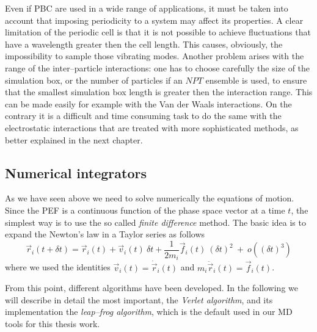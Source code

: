 Even if \ac{PBC} are used in a wide range of applications, it must be taken into account that imposing
periodicity to a system may affect its properties. A clear limitation of the periodic cell is that it is not
possible to achieve fluctuations that have a wavelength greater then the cell length. This causes, obviously, the
impossibility to sample those vibrating modes. Another problem arises with the range of the inter--particle
interactions: one has to choose carefully the size of the simulation box, or the number of particles if an $NPT$
ensemble is used, to ensure that the smallest simulation box length is greater then the interaction range. This
can be made easily for example with the Van der Waals interactions. On the contrary it is a difficult and time
consuming task to do the same with the electrostatic interactions that are treated with more sophisticated
methods, as better explained in the next chapter.

\subsection{Numerical integrators}
As we have seen above we need to solve numerically the equations of motion. Since the \ac{PEF} is a continuous
function of the phase space vector at a time $t$, the simplest way is to use the so called \textit{finite
difference} method. The basic idea is to expand the Newton's law in a Taylor series as follows
\begin{equation}
	\vec r_i(t + \delta t) = \vec r_i(t) + \vec v_i(t)\ \delta t + \frac{1}{2m_i}\vec f_i(t)\ (\delta t)^2\ +\ o((\delta t)^3)
	\label{eq:newtonTaylor}
\end{equation}
where we used the identities $\vec v_i(t) = \dot{\vec r}_i(t)$ and $m_i\ddot{\vec r}_i(t) = \vec f_i(t)$.

From this point, different algorithms have been developed. In the following we will describe in detail the most
important, the \textit{Verlet algorithm}, and its implementation the \textit{leap--frog algorithm}, which is the
default used in our \ac{MD} tools for this thesis work.


